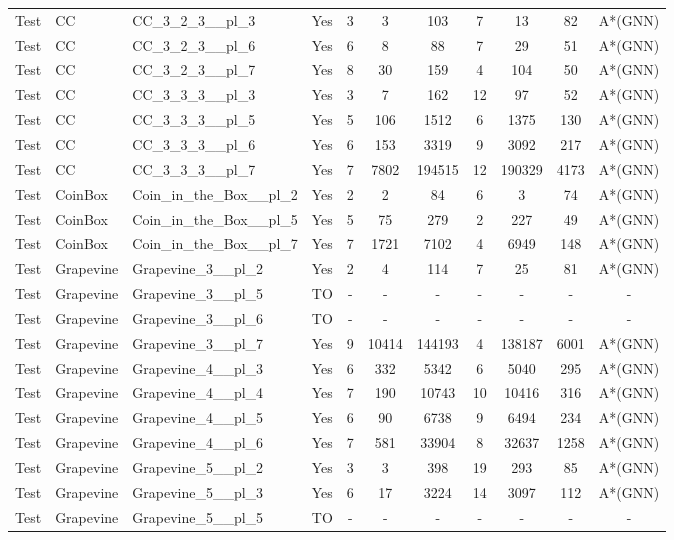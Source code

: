 \documentclass{article}
\begin{document}
\begin{tabular}{lllcccccccc}
Test & CC & CC\_3\_2\_3\_\_pl\_3 & Yes & 3 & 3 & 103 & 7 & 13 & 82 & A*(GNN) \\
Test & CC & CC\_3\_2\_3\_\_pl\_6 & Yes & 6 & 8 & 88 & 7 & 29 & 51 & A*(GNN) \\
Test & CC & CC\_3\_2\_3\_\_pl\_7 & Yes & 8 & 30 & 159 & 4 & 104 & 50 & A*(GNN) \\
Test & CC & CC\_3\_3\_3\_\_pl\_3 & Yes & 3 & 7 & 162 & 12 & 97 & 52 & A*(GNN) \\
Test & CC & CC\_3\_3\_3\_\_pl\_5 & Yes & 5 & 106 & 1512 & 6 & 1375 & 130 & A*(GNN) \\
Test & CC & CC\_3\_3\_3\_\_pl\_6 & Yes & 6 & 153 & 3319 & 9 & 3092 & 217 & A*(GNN) \\
Test & CC & CC\_3\_3\_3\_\_pl\_7 & Yes & 7 & 7802 & 194515 & 12 & 190329 & 4173 & A*(GNN) \\
Test & CoinBox & Coin\_in\_the\_Box\_\_pl\_2 & Yes & 2 & 2 & 84 & 6 & 3 & 74 & A*(GNN) \\
Test & CoinBox & Coin\_in\_the\_Box\_\_pl\_5 & Yes & 5 & 75 & 279 & 2 & 227 & 49 & A*(GNN) \\
Test & CoinBox & Coin\_in\_the\_Box\_\_pl\_7 & Yes & 7 & 1721 & 7102 & 4 & 6949 & 148 & A*(GNN) \\
Test & Grapevine & Grapevine\_3\_\_pl\_2 & Yes & 2 & 4 & 114 & 7 & 25 & 81 & A*(GNN) \\
Test & Grapevine & Grapevine\_3\_\_pl\_5 & TO & - & - & - & - & - & - & - \\
Test & Grapevine & Grapevine\_3\_\_pl\_6 & TO & - & - & - & - & - & - & - \\
Test & Grapevine & Grapevine\_3\_\_pl\_7 & Yes & 9 & 10414 & 144193 & 4 & 138187 & 6001 & A*(GNN) \\
Test & Grapevine & Grapevine\_4\_\_pl\_3 & Yes & 6 & 332 & 5342 & 6 & 5040 & 295 & A*(GNN) \\
Test & Grapevine & Grapevine\_4\_\_pl\_4 & Yes & 7 & 190 & 10743 & 10 & 10416 & 316 & A*(GNN) \\
Test & Grapevine & Grapevine\_4\_\_pl\_5 & Yes & 6 & 90 & 6738 & 9 & 6494 & 234 & A*(GNN) \\
Test & Grapevine & Grapevine\_4\_\_pl\_6 & Yes & 7 & 581 & 33904 & 8 & 32637 & 1258 & A*(GNN) \\
Test & Grapevine & Grapevine\_5\_\_pl\_2 & Yes & 3 & 3 & 398 & 19 & 293 & 85 & A*(GNN) \\
Test & Grapevine & Grapevine\_5\_\_pl\_3 & Yes & 6 & 17 & 3224 & 14 & 3097 & 112 & A*(GNN) \\
Test & Grapevine & Grapevine\_5\_\_pl\_5 & TO & - & - & - & - & - & - & - \\

\end{tabular}
\end{document}
